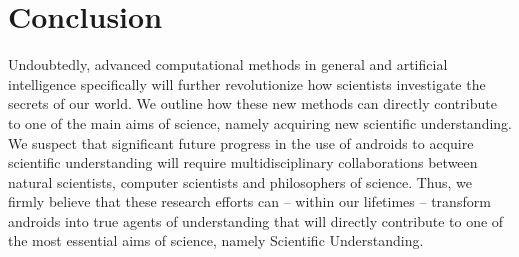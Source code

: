 \section{Conclusion}
Undoubtedly, advanced computational methods in general and artificial intelligence specifically will further revolutionize how scientists investigate the secrets of our world. We outline how these new methods can directly contribute to one of the main aims of science, namely acquiring new scientific understanding. We suspect that significant future progress in the use of androids to acquire scientific understanding will require multidisciplinary collaborations between natural scientists, computer scientists and philosophers of science. Thus, we firmly believe that these research efforts can -- within our lifetimes -- transform androids into true agents of understanding that will directly contribute to one of the most essential aims of science, namely Scientific Understanding.


